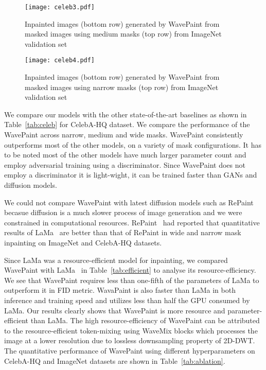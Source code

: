 \documentclass{article}
\begin{document}
\begin{figure*}[t]
\centering
\texttt{[image: celeb3.pdf]}
\caption{Inpainted images (bottom row) generated by WavePaint from masked images using medium masks (top row) from ImageNet validation set}
\label{fig:medium}
\end{figure*}

\begin{figure*}[]
\centering
\texttt{[image: celeb4.pdf]}
\caption{Inpainted images (bottom row) generated by WavePaint from masked images using narrow masks (top row) from ImageNet validation set}
\label{fig:narrow}
\end{figure*}

We compare our models with the other state-of-the-art baselines as shown in Table~\ref{tab:celeb} for CelebA-HQ dataset. We compare the performance of the WavePaint across narrow, medium and wide masks. WavePaint consistently outperforms most of the other models, on a variety of mask configurations. It has to be noted most of the other models have much larger parameter count and employ adversarial training using a discriminator. Since WavePaint does not employ a discriminator it is light-wight, it can be trained faster than GANs and diffusion models. 

We could not compare WavePaint with latest diffusion models such as RePaint~\cite{lugmayr2022repaint} becasue diffusion is a much slower process of image generation and we were constrained in computational resources. RePaint~\cite{lugmayr2022repaint} had reported that quantitative results of LaMa~\cite{Lama_2021} are better than that of RePaint in wide and narrow mask inpainting on ImageNet and CelebA-HQ datasets. 

Since LaMa was a resource-efficient model for inpainting, we compared WavePaint with LaMa~\cite{Lama_2021} in  Table~\ref{tab:efficient} to analyse its resource-efficiency. We see that WavePaint requires less than one-fifth of the parameters of LaMa to outperform it in FID metric. WavaPaint is also  faster 
than LaMa in both inference and training speed and utilizes less than half the GPU consumed by LaMa. Our results clearly shows that WavePaint is more resource and parameter-efficient than LaMa. The high resource-efficiency of WavePaint can be attributed to the resource-efficient token-mixing using WaveMix blocks which processes the image at a lower resolution due to lossless downsampling property of 2D-DWT. The quantitative performance of WavePaint using different hyperparameters on CelebA-HQ and ImageNet datasets are shown in Table~\ref{tab:ablation}. 
\end{document}
